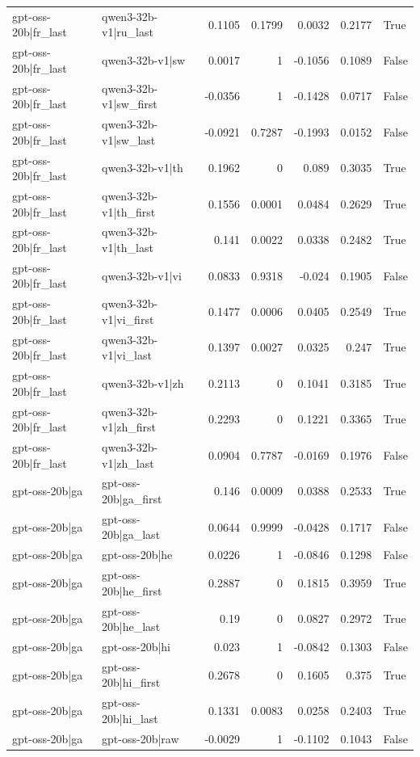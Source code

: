 \begin{table}
\begin{tabular}{l l r r r r l}
gpt-oss-20b|fr_last & qwen3-32b-v1|ru_last & 0.1105 & 0.1799 & 0.0032 & 0.2177 & True \\
gpt-oss-20b|fr_last & qwen3-32b-v1|sw & 0.0017 & 1 & -0.1056 & 0.1089 & False \\
gpt-oss-20b|fr_last & qwen3-32b-v1|sw_first & -0.0356 & 1 & -0.1428 & 0.0717 & False \\
gpt-oss-20b|fr_last & qwen3-32b-v1|sw_last & -0.0921 & 0.7287 & -0.1993 & 0.0152 & False \\
gpt-oss-20b|fr_last & qwen3-32b-v1|th & 0.1962 & 0 & 0.089 & 0.3035 & True \\
gpt-oss-20b|fr_last & qwen3-32b-v1|th_first & 0.1556 & 0.0001 & 0.0484 & 0.2629 & True \\
gpt-oss-20b|fr_last & qwen3-32b-v1|th_last & 0.141 & 0.0022 & 0.0338 & 0.2482 & True \\
gpt-oss-20b|fr_last & qwen3-32b-v1|vi & 0.0833 & 0.9318 & -0.024 & 0.1905 & False \\
gpt-oss-20b|fr_last & qwen3-32b-v1|vi_first & 0.1477 & 0.0006 & 0.0405 & 0.2549 & True \\
gpt-oss-20b|fr_last & qwen3-32b-v1|vi_last & 0.1397 & 0.0027 & 0.0325 & 0.247 & True \\
gpt-oss-20b|fr_last & qwen3-32b-v1|zh & 0.2113 & 0 & 0.1041 & 0.3185 & True \\
gpt-oss-20b|fr_last & qwen3-32b-v1|zh_first & 0.2293 & 0 & 0.1221 & 0.3365 & True \\
gpt-oss-20b|fr_last & qwen3-32b-v1|zh_last & 0.0904 & 0.7787 & -0.0169 & 0.1976 & False \\
gpt-oss-20b|ga & gpt-oss-20b|ga_first & 0.146 & 0.0009 & 0.0388 & 0.2533 & True \\
gpt-oss-20b|ga & gpt-oss-20b|ga_last & 0.0644 & 0.9999 & -0.0428 & 0.1717 & False \\
gpt-oss-20b|ga & gpt-oss-20b|he & 0.0226 & 1 & -0.0846 & 0.1298 & False \\
gpt-oss-20b|ga & gpt-oss-20b|he_first & 0.2887 & 0 & 0.1815 & 0.3959 & True \\
gpt-oss-20b|ga & gpt-oss-20b|he_last & 0.19 & 0 & 0.0827 & 0.2972 & True \\
gpt-oss-20b|ga & gpt-oss-20b|hi & 0.023 & 1 & -0.0842 & 0.1303 & False \\
gpt-oss-20b|ga & gpt-oss-20b|hi_first & 0.2678 & 0 & 0.1605 & 0.375 & True \\
gpt-oss-20b|ga & gpt-oss-20b|hi_last & 0.1331 & 0.0083 & 0.0258 & 0.2403 & True \\
gpt-oss-20b|ga & gpt-oss-20b|raw & -0.0029 & 1 & -0.1102 & 0.1043 & False \\

\end{tabular}
\end{table}
